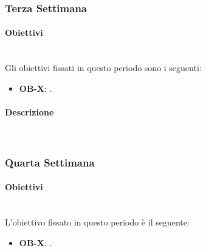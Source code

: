 {	\subsubsection{Terza Settimana}
		\paragraph{}
		\paragraph*{Obiettivi} \mbox{}\\ [1mm]
		Gli obiettivi fissati in questo periodo sono i seguenti:
		\begin{itemize}
			\item \textbf{OB-X}: .
		\end{itemize}
		\paragraph*{Descrizione} \mbox{}\\ [1mm]
	
    \subsubsection{Quarta Settimana}
    	\paragraph{}
    	\paragraph*{Obiettivi} \mbox{}\\ [1mm]
    	L'obiettivo fissato in questo periodo è il seguente:
        \begin{itemize}
            \item \textbf{OB-X}: .
        \end{itemize}
    	
}
